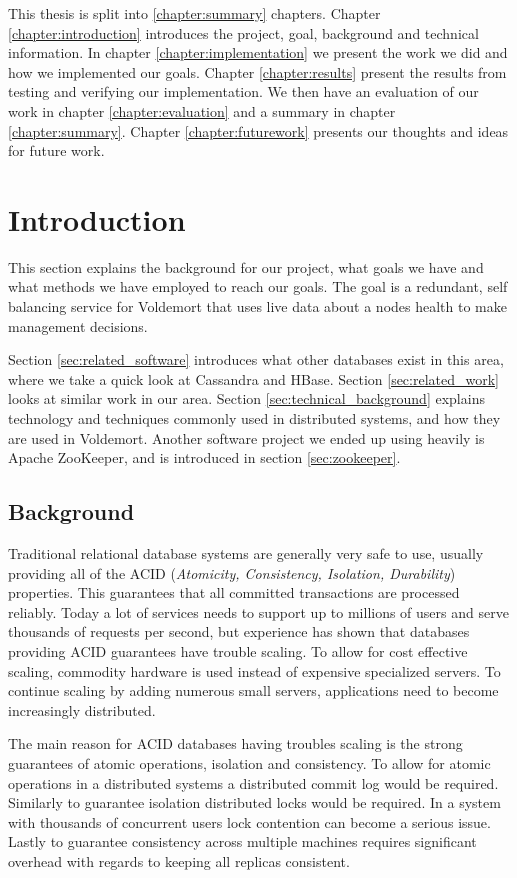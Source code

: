 
This thesis is split into \ref{chapter:summary} chapters. Chapter \ref{chapter:introduction} introduces the project, goal, background and technical information. In chapter \ref{chapter:implementation} we present the work we did and how we implemented our goals. Chapter \ref{chapter:results} present the results from testing and verifying our implementation. We then have an evaluation of our work in chapter \ref{chapter:evaluation} and a summary in chapter \ref{chapter:summary}. Chapter \ref{chapter:futurework} presents our thoughts and ideas for future work.

\section{Introduction}
This section explains the background for our project, what goals we have and what methods we have employed to reach our goals. 
The goal is a redundant, self balancing service for Voldemort that uses live data about a nodes health to make management decisions.

Section \ref{sec:related_software} introduces what other databases exist in this area, where we take a quick look at Cassandra and HBase.
Section \ref{sec:related_work} looks at similar work in our area.
Section \ref{sec:technical_background} explains technology and techniques commonly used in distributed systems, and how they are used in Voldemort.
Another software project we ended up using heavily is Apache ZooKeeper, and is introduced in section \ref{sec:zookeeper}.

\subsection{Background}
Traditional relational database systems are generally very safe to use, usually providing all of the ACID (\emph{Atomicity, Consistency, Isolation, Durability}) properties.
This guarantees that all committed transactions are processed reliably. 
Today a lot of services needs to support up to millions of users and serve thousands of requests per second, but experience has shown that databases providing ACID guarantees have trouble scaling. 
To allow for cost effective scaling, commodity hardware is used instead of expensive specialized servers. To continue scaling by adding numerous small servers, applications need to become increasingly distributed.

The main reason for ACID databases having troubles scaling is the strong guarantees of atomic operations, isolation and consistency. 
To allow for atomic operations in a distributed systems a distributed commit log would be required. 
Similarly to guarantee isolation distributed locks would be required. In a system with thousands of concurrent users lock contention can become a serious issue. 
Lastly to guarantee consistency across multiple machines requires significant overhead with regards to keeping all replicas consistent. 

